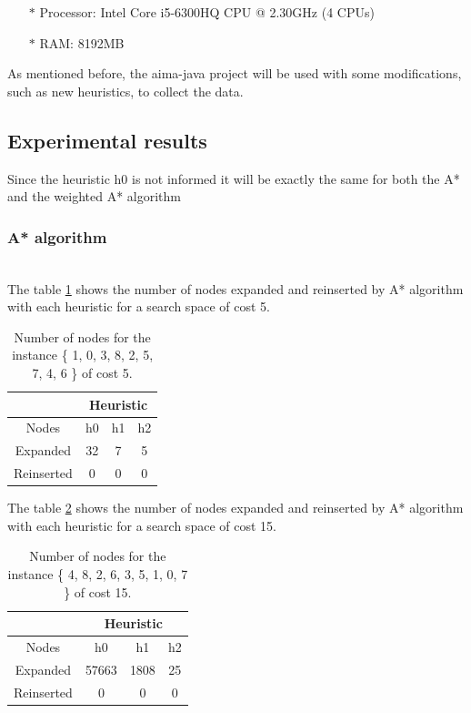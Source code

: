 \documentclass[runningheads]{llncs}
\begin{document}
\begin{itemize}
\item[$\ast$] Processor: Intel Core i5-6300HQ CPU @ 2.30GHz (4 CPUs)
\item[$\ast$] RAM: 8192MB
\end{itemize}
As mentioned before, the aima-java project will be used with some modifications, such as new heuristics, to collect the data.
\subsection{Experimental results}
Since the heuristic h0 is not informed it will be exactly the same for both the A* and the weighted A* algorithm
\subsubsection{A* algorithm}~\\

The table \ref{tab:table1} shows the number of nodes expanded and reinserted by A* algorithm with each heuristic for a search space of cost 5.
\begin{table}
    \centering
\caption{\label{tab:table1}Number of nodes for the instance \{ 1, 0, 3, 8, 2, 5, 7, 4, 6 \} of cost 5.}
    \begin{tabular}{|c|c|c|c|}
    \hline
       & \multicolumn{3}{|c|}{Heuristic} \\ \hline
        Nodes & h0 & h1 & h2 \\ \hline
        Expanded & 32 & 7 & 5 \\ \hline
        Reinserted & 0 & 0 & 0 \\ \hline
    \end{tabular}
\end{table}

The table \ref{tab:table2} shows the number of nodes expanded and reinserted by A* algorithm with each heuristic for a search space of cost 15.
\begin{table}
    \centering
\caption{\label{tab:table2}Number of nodes for the instance \{ 4, 8, 2, 6, 3, 5, 1, 0, 7 \} of cost 15.}
    \begin{tabular}{|c|c|c|c|}
    \hline
       & \multicolumn{3}{|c|}{Heuristic} \\ \hline
        Nodes & h0 & h1 & h2 \\ \hline
        Expanded & 57663 & 1808 & 25 \\ \hline
        Reinserted & 0 & 0 & 0 \\ \hline
    \end{tabular}
\end{table}
\end{document}
